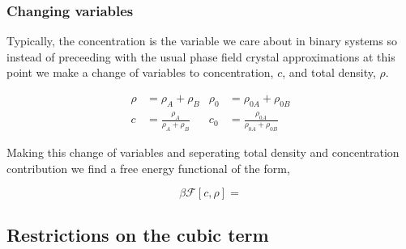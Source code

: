 \documentclass[11pt]{article}
\newcommand{\F}{\mathcal{F}}
\newcommand{\f}{\frac}
\begin{document}
\subsubsection{Changing variables}
Typically, the concentration is the variable we care about in binary systems so instead of preceeding with the usual phase field crystal approximations at this point we make a change of variables to concentration, $c$, and total density, $\rho$.

\begin{align}
    \rho &= \rho_A + \rho_B             & \rho_0 &= \rho_{0A} + \rho_{0B} \nonumber \\
    c &= \f{\rho_A}{\rho_A + \rho_B}    &  c_0 &= \f{\rho_{0A}}{\rho_{0A} + \rho_{0B}} \nonumber
\end{align}

Making this change of variables and seperating total density and concentration contribution we find a free energy functional of the form,

\begin{equation}
    \beta\F[c, \rho] = 
\end{equation}

\subsection{Restrictions on the cubic term}
\end{document}

